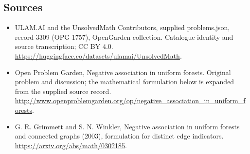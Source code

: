 \documentclass[11pt,a4paper]{article}
\begin{document}
\subsection{Sources}
\begin{itemize}
\item[S1] ULAM.AI and the UnsolvedMath Contributors, supplied problems.json, record 3309 (OPG-1757), OpenGarden collection. Catalogue identity and source transcription; CC BY 4.0.
\url{https://huggingface.co/datasets/ulamai/UnsolvedMath}.
\item[S2] Open Problem Garden, Negative association in uniform forests. Original problem and discussion; the mathematical formulation below is expanded from the supplied source record.
\url{http://www.openproblemgarden.org/op/negative_association_in_uniform_forests}.
\item[S3] G. R. Grimmett and S. N. Winkler, Negative association in uniform forests and connected graphs (2003), formulation for distinct edge indicators.
\url{https://arxiv.org/abs/math/0302185}.
\end{itemize}
\end{document}
